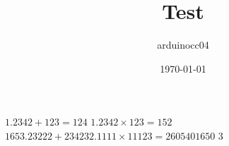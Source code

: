 \documentclass[chapter, a4paper]{oblivoir}
\author{arduinocc04}
\date{\today}
\title{Test}
\begin{document}
    \maketitle
    $1.2342 + 123 = 124$
    $1.2342 \times 123 = 152$
    $1653.23222 + 234232.1111 \times 11123 = 2605401650$%
    3
\end{document}
